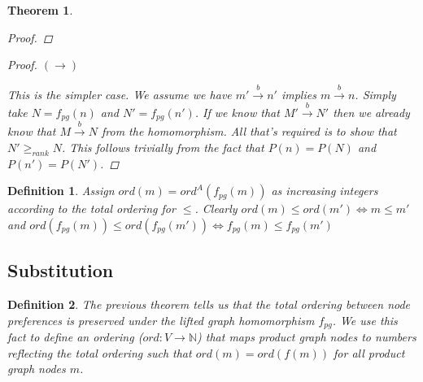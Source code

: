 \documentclass[twocolumn]{sig-alternate-10pt}
\newtheorem{thm}{Theorem}[section]
\newtheorem{defn}{Definition}
\begin{document}
\begin{thm}
\begin{proof}
  \end{proof}

  \begin{proof}
    $(\rightarrow)$

    This is the simpler case. We assume we have $m' \overset{b}{\rightarrow} n'$ implies $m \overset{b}{\rightarrow} n$.
    Simply take $N = f_{pg}(n)$ and $N' = f_{pg}(n')$. If we know that $M' \overset{b}{\rightarrow} N'$ then we already know that $M \overset{b}{\rightarrow} N$ from the homomorphism. All that's required is to show that $N' \geq_{rank} N$. This follows trivially from the fact that $P(n) = P(N)$ and $P(n') = P(N')$.
  \end{proof}

\end{thm}

\begin{defn}
  Assign $ord(m) = ord^A(f_{pg}(m))$ as increasing integers according to the total ordering for $\leq$.
  Clearly $ord(m) \leq ord(m') \iff m \leq m'$ and $ord(f_{pg}(m)) \leq ord(f_{pg}(m')) \iff f_{pg}(m) \leq f_{pg}(m')$
\end{defn}


\subsection{Substitution}

\begin{defn}
  The previous theorem tells us that the total ordering between node preferences is preserved under the lifted graph homomorphism $f_{pg}$. 
  We use this fact to define an ordering ($ord : V \rightarrow \mathbb{N}$) that maps product graph nodes to numbers reflecting the total ordering such that $ord(m) = ord(f(m))$ for all product graph nodes $m$.
\end{defn} 
\end{document}
